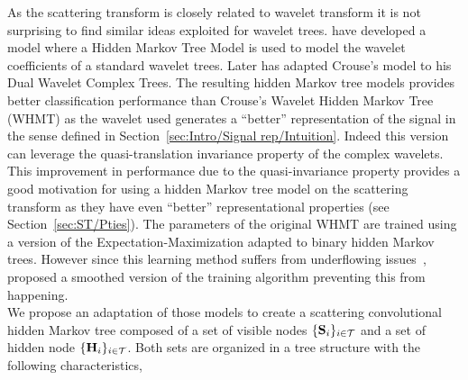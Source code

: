 \documentclass[a4paper,11pt]{report}
\begin{document}
		As the scattering transform is closely related to wavelet transform it is not surprising to find similar ideas exploited for wavelet trees. \citet{crouse1998wavelet} have developed a model where a Hidden Markov Tree Model is used to model the wavelet coefficients of a standard wavelet trees. Later \citet{kingsbury2001complex} has  adapted Crouse's model to his Dual Wavelet Complex Trees. The resulting hidden Markov tree models provides better classification performance than Crouse's Wavelet Hidden Markov Tree (WHMT) as the wavelet used generates a ``better'' representation of the signal in the sense defined in Section~\ref{sec:Intro/Signal rep/Intuition}. Indeed this version can leverage the quasi-translation invariance property of the complex wavelets. This improvement in performance due to the quasi-invariance property provides a good motivation for using a hidden Markov tree model on the scattering transform as they have even ``better'' representational properties (see Section~\ref{sec:ST/Pties}). The parameters of the original WHMT are trained using a version of the Expectation-Maximization adapted to binary hidden Markov trees. However since this learning method suffers from underflowing issues~\citep{devijver1985baum}, \citet{durand2004computational} proposed a smoothed version of the training algorithm preventing this from happening.\\
     
	  We propose an adaptation of those models to create a scattering convolutional hidden Markov tree composed of a set of visible nodes $\{{\bf S}_{i}\}_{i \in \mathcal{T}}$ and a set of hidden node $\{{\bf H}_{i}\}_{i \in \mathcal{T}}$. Both sets are organized in a tree structure with the following characteristics,\\
	  
\end{document}
